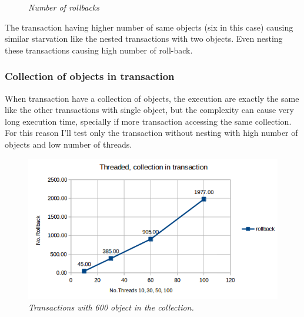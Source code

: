 \documentclass[12pt]{article}
\begin{document}
\begin{figure}[h!]%
    \centering
    \qquad
    \caption*{\textit{\color{gray}Number of rollbacks}}%
    \label{fig:example}%
\end{figure}
The transaction having higher number of same objects (six in this case) causing similar starvation like the nested transactions with two objects. Even nesting these transactions causing high number of roll-back. 


\subsubsection{Collection of objects in transaction}
When transaction have a collection of objects, the execution are exactly the same like the other transactions with single object, but the complexity can cause very long execution time, specially if more transaction accessing the same collection. For this reason I'll test only the transaction without nesting with high number of objects and low number of threads.

\begin{figure}[h!]
\centering
\includegraphics[scale=0.6]{Pictures/collection.png}
\caption*{\textit{\color{gray}Transactions with 600 object in the collection.}}
\end{figure}
\end{document}
